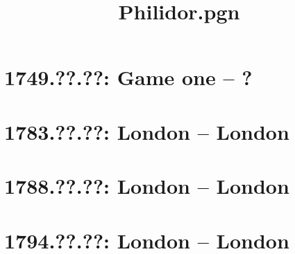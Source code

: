 \documentclass[11pt]{article}
\title{Philidor.pgn}
\begin{document}
\maketitle


\tableofcontents
\pagebreak[4]

\printindex
\pagebreak[4]

\section{1749.??.??: Game one -- ?}

\pagebreak[4]

\section{1783.??.??: London -- London}

\pagebreak[4]

\section{1788.??.??: London -- London}

\pagebreak[4]

\section{1794.??.??: London -- London}

\pagebreak[4]


\pagebreak[4]


\pagebreak[4]
\end{document}
